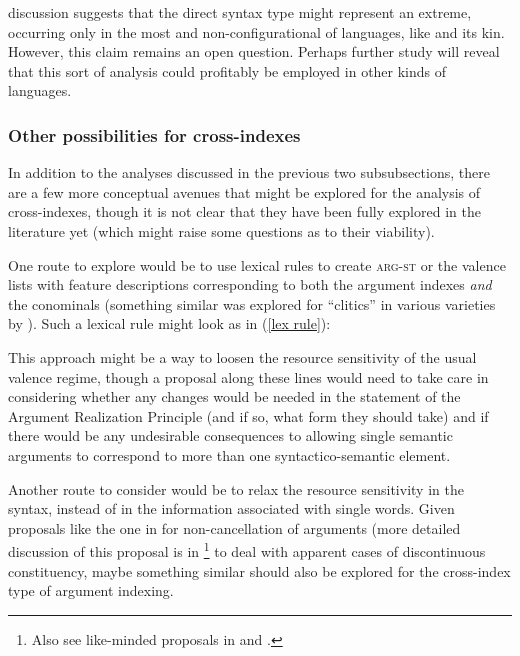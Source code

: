 \documentclass[output=paper,biblatex,babelshorthands,newtxmath,draftmode,colorlinks,citecolor=brown]{langscibook}
\begin{document}
 discussion suggests that the direct syntax type might represent an extreme, occurring only in the most  and non-configurational of languages, like  and its  kin. However, this claim remains an open question. Perhaps further study will reveal that this sort of analysis could profitably be employed in other kinds of languages.  

\subsubsection{Other possibilities for cross-indexes} \label{other poss for cross}

In addition to the analyses discussed in the previous two subsubsections, there are a few more conceptual avenues that might be explored for the analysis of cross-indexes, though it is not clear that they have been fully explored in the literature yet (which might raise some questions as to their viability). 

One route to explore would be to use lexical rules to create \textsc{arg-st} or the valence lists with feature descriptions corresponding to both the argument indexes \emph{and} the conominals (something similar was explored for ``clitics'' in various  varieties by \citealt{monachesi05}). Such a lexical rule might look as in (\ref{lex rule}):
%
\ea
\label{lex rule}
 \\								 
\flushright	
{}
\z
\medskip

\largerpage
\noindent
This approach might be a way to loosen the resource sensitivity of the usual valence regime, though a proposal along these lines would need to take care in considering whether any changes would be needed in the statement of the Argument Realization Principle (and if so, what form they should take) and if there would be any undesirable consequences to allowing single semantic arguments to correspond to more than one syntactico-semantic element.    

Another route to consider would be to relax the resource sensitivity in the syntax, instead of in the information associated with single words. Given proposals like the one in \citet{Bender2008a} for non-cancellation of arguments (more detailed discussion of this proposal is in \footnote{Also see like-minded proposals in \citet{Meurers99b} and \citet{Mueller2008a}.} to deal with apparent cases of discontinuous constituency, maybe something similar should also be explored for the cross-index type of argument indexing. 
\end{document}
